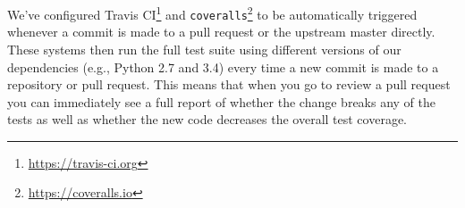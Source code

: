 %
%





We've configured Travis CI\footnote{\url{https://travis-ci.org}} and
\texttt{coveralls}\footnote{\url{https://coveralls.io}} to be automatically
triggered whenever a commit is made to a pull request or the upstream
master directly.  These systems then run the full test suite 
using different versions of our dependencies (e.g., Python 2.7 and 3.4) %
every time a
new commit is made to a repository or pull request.
This means that when you go to review a pull request you can immediately see
a full report of whether the change breaks any of the tests as well as whether
the new code decreases the overall test coverage.

